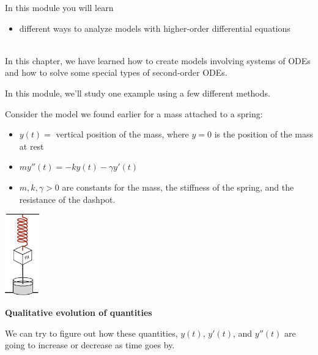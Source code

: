 In this module you will learn
\begin{itemize}
	\item different ways to analyze models with higher-order differential equations
\end{itemize}

\hfill \\



In this chapter, we have learned how to create models involving systems of ODEs and how to solve some special types of second-order ODEs.



In this module, we'll study one example using a few different methods.

\begin{example}
Consider the model we found earlier for a mass attached to a spring:

\begin{minipage}{0.85\textwidth}
\begin{itemize}
	\item $y(t)=$ vertical position of the mass, where $y=0$ is the position of the mass at rest
	\item $my''(t) = -k y(t) - \gamma y'(t)$
	\item $m,k,\gamma>0$ are constants for the mass, the stiffness of the spring, and the resistance of the dashpot.
\end{itemize}
\end{minipage}
\begin{minipage}{50pt}
\includegraphics*[height=100pt]{images/module16-spring-mass-dashpot.pdf}	
\end{minipage}
\end{example}

\hfill

\begin{center}
\textbf{\color{cyan}
Qualitative evolution of quantities
}
\end{center}


We can try to figure out how these quantities, $y(t)$, $y'(t)$, and $y''(t)$ are going to increase or decrease as time goes by. \\


